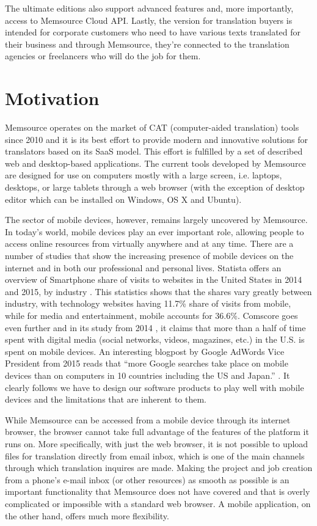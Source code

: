 The ultimate editions also support advanced features and, more importantly, access to Memsource Cloud API. Lastly, the version for translation buyers is intended for corporate customers who need to have various texts translated for their business and through Memsource, they're connected to the translation agencies or freelancers who will do the job for them. 


\section{Motivation}

Memsource operates on the market of CAT  (computer-aided translation) tools since 2010 and it is its best effort to provide modern and innovative solutions for translators based on its SaaS model. This effort is fulfilled by a set of described web and desktop-based applications. The current tools developed by Memsource are designed for use on computers mostly with a large screen, i.e. laptops, desktops, or large tablets through a web browser (with the exception of desktop editor which can be installed on Windows, OS X and Ubuntu).

The sector of mobile devices, however, remains largely uncovered by Memsource. In today's world, mobile devices play an ever important role, allowing people to access online resources from virtually anywhere and at any time. There are a number of studies that show the increasing presence of mobile devices on the internet and in both our professional and personal lives. 
Statista  offers an overview of Smartphone share of visits to websites in the United States in 2014 and 2015, by industry \cite{statista}. This statistics shows that the shares vary greatly between industry, with technology websites having 11.7\% share of visits from mobile, while for media and entertainment, mobile accounts for 36.6\%. Comscore goes even further and in its study from 2014 \cite{comscore}, it claims that more than a half of time spent with digital media (social networks, videos, magazines, etc.) in the U.S. is spent on mobile devices. An interesting blogpost by Google AdWords Vice President from 2015 reads that ``more Google searches take place on mobile devices than on computers in 10 countries including the US and Japan.'' \cite{googleAdwords}. It clearly follows we have to design our software products to play well with mobile devices and the limitations that are inherent to them. 

While Memsource can be accessed from a mobile device through its internet browser, the browser cannot take full advantage of the features of the platform it runs on. More specifically, with just the web browser, it is not possible to upload files for translation directly from email inbox, which is one of the main channels through which translation inquires are made. Making the project and job creation from a phone's e-mail inbox (or other resources) as smooth as possible is an important functionality that Memsource does not have covered and that is overly complicated or impossible with a standard web browser. A mobile application, on the other hand, offers much more flexibility. 

